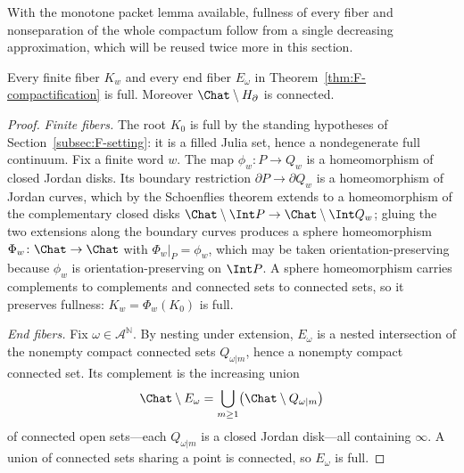 With the monotone packet lemma available, fullness of every fiber and
nonseparation of the whole compactum follow from a single decreasing
approximation, which will be reused twice more in this section.

\begin{theorem}\label{thm:full-fibers}
Every finite fiber $K_w$ and every end fiber $E_\omega$ in
Theorem~\ref{thm:F-compactification} is full.  Moreover
$\Chat\setminus H_\partial$ is connected.
\end{theorem}

\begin{proof}
\emph{Finite fibers.}
The root $K_0$ is full by the standing hypotheses of
Section~\ref{subsec:F-setting}: it is a filled Julia set, hence a
nondegenerate full continuum.  Fix a finite word $w$.  The map
$\phi_w\colon P\to Q_w$ is a homeomorphism of closed Jordan disks.  Its
boundary restriction $\partial P\to\partial Q_w$ is a homeomorphism of
Jordan curves, which by the Schoenflies theorem \cite{New51} extends to a
homeomorphism of the complementary closed disks
$\Chat\setminus\Int P\to\Chat\setminus\Int Q_w$; gluing the two
extensions along the boundary curves produces a sphere homeomorphism
$\Phi_w\colon\Chat\to\Chat$ with $\Phi_w|_P=\phi_w$, which may be taken
orientation-preserving because $\phi_w$ is orientation-preserving on
$\Int P$.  A sphere homeomorphism carries complements to complements and
connected sets to connected sets, so it preserves fullness:
$K_w=\Phi_w(K_0)$ is full.

\emph{End fibers.}
Fix $\omega\in\mathcal A^{\mathbb N}$.  By nesting under extension,
$E_\omega$ is a nested intersection of the nonempty compact connected
sets $Q_{\omega|m}$, hence a nonempty compact connected set.  Its
complement is the increasing union
\[
\Chat\setminus E_\omega
=\bigcup_{m\ge1}\bigl(\Chat\setminus Q_{\omega|m}\bigr)
\]
of connected open sets---each $Q_{\omega|m}$ is a closed Jordan
disk---all containing $\infty$.  A union of connected sets sharing a
point is connected, so $E_\omega$ is full.


\end{proof}
